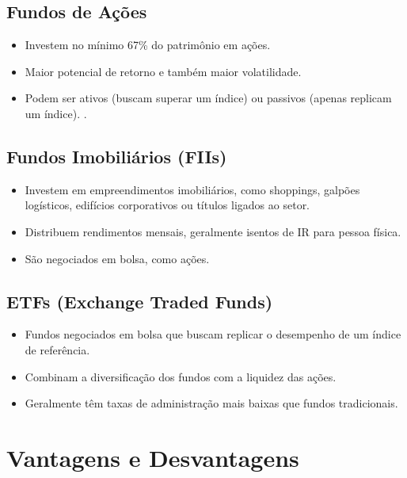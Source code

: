 \subsection{Fundos de Ações}
\begin{itemize}[leftmargin=*]
    \item Investem no mínimo 67\% do patrimônio em ações.
    \item Maior potencial de retorno e também maior volatilidade.
    \item Podem ser ativos (buscam superar um índice) ou passivos (apenas replicam um índice).
    .
\end{itemize}

\subsection{Fundos Imobiliários (FIIs)}
\begin{itemize}[leftmargin=*]
    \item Investem em empreendimentos imobiliários, como shoppings, galpões logísticos, edifícios corporativos ou títulos ligados ao setor.
    \item Distribuem rendimentos mensais, geralmente isentos de IR para pessoa física.
    \item São negociados em bolsa, como ações.
    
\end{itemize}

\subsection{ETFs (Exchange Traded Funds)}
\begin{itemize}[leftmargin=*]
    \item Fundos negociados em bolsa que buscam replicar o desempenho de um índice de referência.
    \item Combinam a diversificação dos fundos com a liquidez das ações.
    \item Geralmente têm taxas de administração mais baixas que fundos tradicionais.
    
\end{itemize}

\section{Vantagens e Desvantagens}

